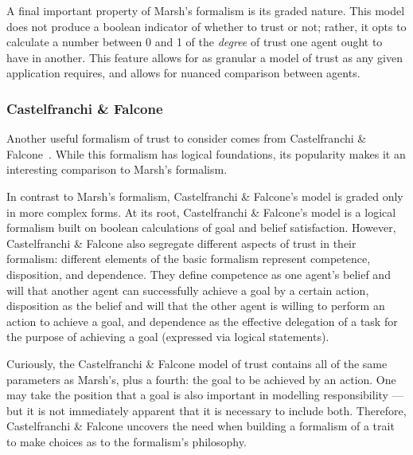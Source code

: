 A final important property of Marsh's formalism is its graded nature. This model does not produce a boolean indicator of whether to trust or not; rather, it opts to calculate a number between 0 and 1 of the \emph{degree} of trust one agent ought to have in another. This feature allows for as granular a model of trust as any given application requires, and allows for nuanced comparison between agents.\par


\subsubsection{Castelfranchi \& Falcone\cite{CastelfranchiSocialApproach}}
Another useful formalism of trust to consider comes from Castelfranchi \& Falcone\cite{CastelfranchiSocialApproach}~. While this formalism has logical foundations, its popularity makes it an interesting comparison to Marsh's formalism.\par

In contrast to Marsh's formalism, Castelfranchi \& Falcone's model is graded only in more complex forms. At its root, Castelfranchi \& Falcone's model is a logical formalism built on boolean calculations of goal and belief satisfaction. However, Castelfranchi \& Falcone also segregate different aspects of trust in their formalism: different elements of the basic formalism represent competence, disposition, and dependence. They define competence as one agent's belief and will that another agent can successfully achieve a goal by a certain action, disposition as the belief and will that the other agent is willing to perform an action to achieve a goal, and dependence as the effective delegation of a task for the purpose of achieving a goal (expressed via logical statements).\par

Curiously, the Castelfranchi \& Falcone model of trust contains all of the same parameters as Marsh's, plus a fourth: the goal to be achieved by an action. One may take the position that a goal is also important in modelling responsibility --- but it is not immediately apparent that it is necessary to include both. Therefore, Castelfranchi \& Falcone uncovers the need when building a formalism of a trait to make choices as to the formalism's philosophy.\par

